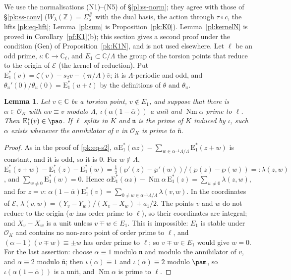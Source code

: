 \documentclass[10pt]{amsart}
\newtheorem{lemma}[theorem]{Lemma}
\theoremstyle{definition}
\theoremstyle{remark}
\newcommand{\C}{\mathbb C}
\newcommand{\Z}{\mathbb Z}
\providecommand{\auNm}{\operatorname{Nm}}
\providecommand{\auO}{\mathcal O}
\providecommand{\aubar}[1]{\overline{#1}}
\begin{document}
We use the normalisations (N1)--(N5) of \S\ref{pl:ss-norm}; they agree with those of
\S\ref{pk:ss-conv} ($W_\lambda(\Z)=\Sigma_\lambda^\#$ with the dual basis, the action through
$\tau\circ c$, the lifts \eqref{pk:eq-lift}; Lemma~\ref{pl:sum} is Proposition~\ref{pk:K0}). Lemma~\ref{pl:kernelN} is proved in Corollary~\ref{pf:K1}(b); this section gives a second proof under the condition (Gen) of Proposition~\ref{pk:K1N}, and is not used elsewhere. Let
$\ell$ be an odd prime, $\iota\colon\C\to\C_\ell$, and $E_1\subset\C/\Lambda$ the group of the
torsion points that reduce to the origin of $\mathcal E$ (the kernel of reduction). Put
$\mathrm E_1^*(v)=\zeta(v)-s_2v-(\boldsymbol\pi/A)\aubar v$; it is $\Lambda$-periodic and odd, and
$\theta_u'(0)/\theta_u(0)=\mathrm E_1^*(u+t)$ by the definitions of $\theta$ and $\theta_u$.

\begin{lemma}\label{pk:E1}
Let $v\in\C$ be a torsion point, $v\notin E_1$, and suppose that there is $\alpha\in\auO_K$ with
$\alpha v\equiv v$ modulo $\Lambda$, $\iota(\alpha(1-\aubar\alpha))$ a unit and $\auNm\alpha$ prime
to $\ell$. Then $\mathrm E_1^*(v)\in\pao$. If $\ell$ splits in $K$ and $\mathfrak n$ is the prime
of $K$ induced by $\iota$, such $\alpha$ exists whenever the annihilator of $v$ in $\auO_K$ is
prime to $\aubar{\mathfrak n}$.
\end{lemma}
\begin{proof}
As in the proof of \eqref{pk:eq-s2}, $\alpha\mathrm E_1^*(\alpha z)-\sum_{w\in\alpha^{-1}\Lambda/
\Lambda}\mathrm E_1^*(z+w)$ is constant, and it is odd, so it is $0$. For $w\notin\Lambda$,
$\mathrm E_1^*(z+w)-\mathrm E_1^*(z)-\mathrm E_1^*(w)=\tfrac12(\wp'(z)-\wp'(w))/(\wp(z)-\wp(w))=:
\lambda(z,w)$, and $\sum_{w\ne0}\mathrm E_1^*(w)=0$. Hence $\alpha\mathrm E_1^*(\alpha z)-\auNm
\alpha\,\mathrm E_1^*(z)=\sum_{w\ne0}\lambda(z,w)$, and for $z=v$:
$\alpha(1-\aubar\alpha)\mathrm E_1^*(v)=\sum_{0\ne w\in\alpha^{-1}\Lambda/\Lambda}\lambda(v,w)$. In
the coordinates of $\mathcal E$, $\lambda(v,w)=(Y_v-Y_w)/(X_v-X_w)+a_1/2$. The points $v$ and $w$
do not reduce to the origin ($w$ has order prime to $\ell$), so their coordinates are integral;
and $X_v-X_w$ is a unit unless $v\mp w\in E_1$. This is impossible: $E_1$ is stable under
$\auO_K$ and contains no non-zero point of order prime to $\ell$, and $(\alpha-1)(v\mp w)\equiv
\pm w$ has order prime to $\ell$; so $v\mp w\in E_1$ would give $w=0$. For the last assertion:
choose $\alpha\equiv1$ modulo $\mathfrak n$ and modulo the annihilator of $v$, and $\alpha\equiv2$
modulo $\aubar{\mathfrak n}$; then $\iota(\alpha)\equiv1$ and $\iota(\aubar\alpha)\equiv2$ modulo
$\pam$, so $\iota(\alpha(1-\aubar\alpha))$ is a unit, and $\auNm\alpha$ is prime to $\ell$.
\end{proof}
\end{document}
